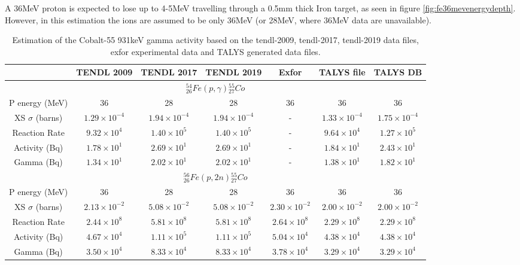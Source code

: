 A 36MeV proton is expected to lose up to 4-5MeV travelling through a 0.5mm thick Iron target, as seen in figure \ref{fig:fe36mevenergydepth}.  However, in this estimation the ions are assumed to be only 36MeV (or 28MeV, where 36MeV data are unavailable).

\begin{table}[h]
\begin{center}
\begin{tabular}{c c c c c c c}
\hline\hline
 & TENDL 2009 & TENDL 2017 & TENDL 2019 & Exfor & TALYS file & TALYS DB \\
\hline\hline
\multicolumn{7}{c}{${}^{54}_{26}Fe(p,\gamma){}^{55}_{27}Co$}\\
P energy (MeV) & 36 & 28 & 28 & 36 & 36 & 36  \\
XS $\sigma$ (barns) & $1.29 \times 10^{-4}$ & $1.94 \times 10^{-4}$ & $1.94\times 10^{-4}$ & - & $1.33 \times 10^{-4}$ & $1.75 \times 10^{-4}$ \\
Reaction Rate & $9.32 \times 10^{4}$ & $1.40 \times 10^{5}$ & $1.40 \times 10^{5}$ & -  & $9.64 \times 10^{4}$ & $1.27\times 10^{5}$ \\
Activity (Bq) & $1.78 \times 10^{1}$ & $2.69 \times 10^{1}$ & $2.69 \times 10^{1}$ & -  & $1.84 \times 10^{1}$ & $2.43 \times 10^{1}$ \\
Gamma (Bq) & $1.34 \times 10^{1}$ & $2.02 \times 10^{1}$ & $2.02 \times 10^{1}$ & -  & $1.38 \times 10^{1}$ & $1.82 \times 10^{1}$ \\
\multicolumn{7}{c}{${}^{56}_{26}Fe(p,2n){}^{55}_{27}Co$}\\
P energy (MeV) & 36 & 28 & 28 & 36 & 36 & 36  \\
XS $\sigma$ (barns) & $2.13 \times 10^{-2}$ & $5.08 \times 10^{-2}$ & $5.08\times 10^{-2}$ & $2.30\times 10^{-2}$ & $2.00 \times 10^{-2}$ & $2.00 \times 10^{-2}$ \\
Reaction Rate & $2.44 \times 10^{8}$ & $5.81 \times 10^{8}$ & $5.81 \times 10^{8}$ & $2.64 \times 10^{8}$  & $2.29 \times 10^{8}$ & $2.29\times 10^{8}$ \\
Activity (Bq) & $4.67 \times 10^{4}$ & $1.11 \times 10^{5}$ & $1.11 \times 10^{5}$ & $5.04 \times 10^{4}$  & $4.38 \times 10^{4}$ & $4.38 \times 10^{4}$ \\
Gamma (Bq) & $3.50 \times 10^{4}$ & $8.33 \times 10^{4}$ & $8.33 \times 10^{4}$ & $3.78 \times 10^{4}$  & $3.29 \times 10^{4}$ & $3.29 \times 10^{4}$ \\
\hline\hline
\end{tabular}
\end{center}
\caption{Estimation of the Cobalt-55 931keV gamma activity based on the \acrshort{tendl}-2009\cite{tendl2009}, \acrshort{tendl}-2017\cite{tendl2017}, \acrshort{tendl}-2019\cite{tendl2019} data files, \acrshort{exfor} experimental data \cite{exforco55} and TALYS generated data files\cite{talys}.}
\label{table:activityestimation2}
\end{table}

